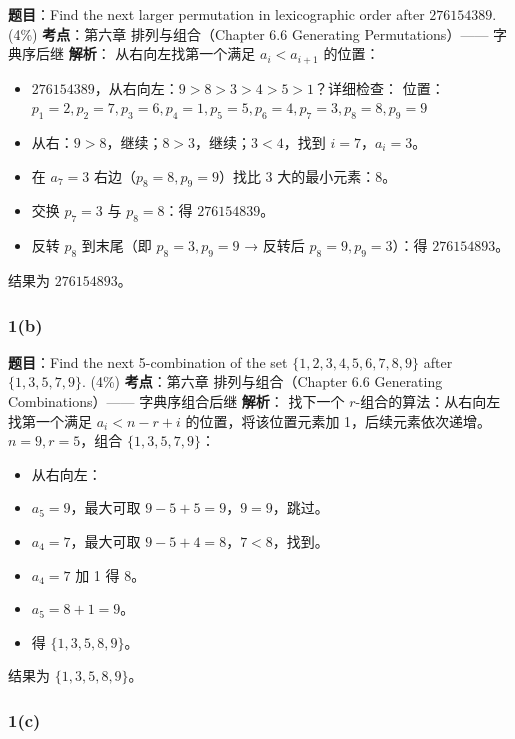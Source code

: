 \documentclass[10pt,a4paper,openany]{ctexbook}
\theoremstyle{definition}
\theoremstyle{remark}
\begin{document}
\textbf{题目}：Find the next larger permutation in lexicographic order after $276154389$. (4\%)
\textbf{考点}：第六章 排列与组合（Chapter 6.6 Generating Permutations）—— 字典序后继
\textbf{解析}：
从右向左找第一个满足 $a_i < a_{i+1}$ 的位置：
\begin{itemize}
\item $276154389$，从右向左：$9 > 8 > 3 > 4 > 5 > 1$？详细检查：
位置：$p_1=2, p_2=7, p_3=6, p_4=1, p_5=5, p_6=4, p_7=3, p_8=8, p_9=9$

\item 从右：$9>8$，继续；$8>3$，继续；$3<4$，找到 $i=7$，$a_i=3$。
\item 在 $a_7=3$ 右边（$p_8=8, p_9=9$）找比 3 大的最小元素：$8$。
\item 交换 $p_7=3$ 与 $p_8=8$：得 $276154839$。
\item 反转 $p_8$ 到末尾（即 $p_8=3, p_9=9$ → 反转后 $p_8=9, p_9=3$）：得 $276154893$。

\end{itemize}

结果为 \textbf{$276154893$}。
\subsubsection{1(b)}

\textbf{题目}：Find the next 5-combination of the set $\{1,2,3,4,5,6,7,8,9\}$ after $\{1,3,5,7,9\}$. (4\%)
\textbf{考点}：第六章 排列与组合（Chapter 6.6 Generating Combinations）—— 字典序组合后继
\textbf{解析}：
找下一个 $r$-组合的算法：从右向左找第一个满足 $a_i < n - r + i$ 的位置，将该位置元素加 1，后续元素依次递增。
$n=9, r=5$，组合 $\{1,3,5,7,9\}$：
\begin{itemize}
\item 从右向左：
\item $a_5=9$，最大可取 $9-5+5=9$，$9=9$，跳过。
\item $a_4=7$，最大可取 $9-5+4=8$，$7<8$，找到。
\item $a_4=7$ 加 1 得 8。
\item $a_5 = 8+1 = 9$。
\item 得 $\{1,3,5,8,9\}$。

\end{itemize}

结果为 \textbf{$\{1,3,5,8,9\}$}。
\subsubsection{1(c)}
\end{document}
